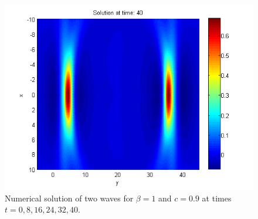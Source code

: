 \documentclass[11pt,a4paper,twoside]{article}
\begin{document}
\begin{figure}[!htbp]
\begin{minipage}[b]{0.31\linewidth}
	\end{minipage}
	\begin{minipage}[b]{0.31\linewidth}
		 \includegraphics[width=\linewidth]{Pictures/Solution2_t=40.png}
	\end{minipage}
	\caption{Numerical solution of two waves for $\beta=1$ and $c = 0.9$ at times $t=0,8,16,24,32,40$.}
	\label{fig:twoWaves}
\end{figure}
\end{document}
